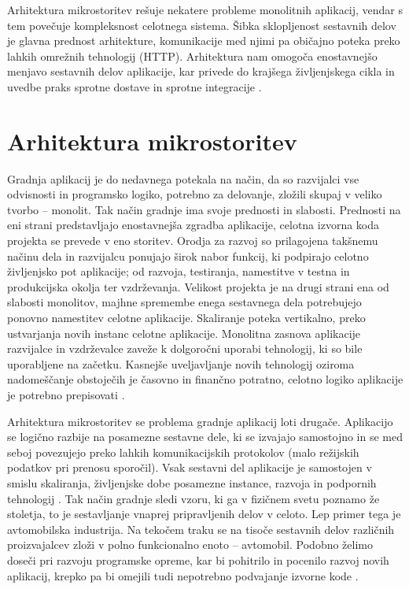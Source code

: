 \documentclass[a4paper, 12pt]{book}
\begin{document}
Arhitektura mikrostoritev rešuje nekatere probleme monolitnih aplikacij, vendar s tem povečuje kompleksnost celotnega sistema.
Šibka sklopljenost sestavnih delov je glavna prednost arhitekture, komunikacije med njimi pa običajno poteka preko lahkih omrežnih tehnologij (HTTP).
Arhitektura nam omogoča enostavnejšo menjavo sestavnih delov aplikacije, kar privede do krajšega življenjskega cikla in uvedbe praks sprotne dostave in sprotne integracije \cite{monolithMicroservice}.


\section{Arhitektura mikrostoritev}

Gradnja aplikacij je do nedavnega potekala na način, da so razvijalci vse odvisnosti in programsko logiko, potrebno za delovanje, zložili skupaj v veliko tvorbo -- monolit.
Tak način gradnje ima svoje prednosti in slabosti.
Prednosti na eni strani predstavljajo enostavnejša zgradba aplikacije, celotna izvorna koda projekta se prevede v eno storitev.
Orodja za razvoj so prilagojena takšnemu načinu dela in razvijalcu ponujajo širok nabor funkcij, ki podpirajo celotno življenjsko pot aplikacije; od razvoja, testiranja, namestitve v testna in produkcijska okolja ter vzdrževanja.
Velikost projekta je na drugi strani ena od slabosti monolitov, majhne spremembe enega sestavnega dela potrebujejo ponovno namestitev celotne aplikacije.
Skaliranje poteka vertikalno, preko ustvarjanja novih instanc celotne aplikacije.
Monolitna zasnova aplikacije razvijalce in vzdrževalce zaveže k dolgoročni uporabi tehnologij, ki so bile uporabljene na začetku.
Kasnejše uveljavljanje novih tehnologij oziroma nadomeščanje obstoječih je časovno in finančno potratno, celotno logiko aplikacije je potrebno prepisovati \cite{monolithMicroservice}.

Arhitektura mikrostoritev se problema gradnje aplikacij loti drugače.
Aplikacijo se logično razbije na posamezne sestavne dele, ki se izvajajo samostojno in se med seboj povezujejo preko lahkih komunikacijskih protokolov (malo režijskih podatkov pri prenosu sporočil).
Vsak sestavni del aplikacije je samostojen v smislu skaliranja, življenjske dobe posamezne instance, razvoja in podpornih tehnologij \cite{7030212}.
Tak način gradnje sledi vzoru, ki ga v fizičnem svetu poznamo že stoletja, to je sestavljanje vnaprej pripravljenih delov v celoto.
Lep primer tega je avtomobilska industrija.
Na tekočem traku se na tisoče sestavnih delov različnih proizvajalcev zloži v polno funkcionalno enoto -- avtomobil.
Podobno želimo doseči pri razvoju programske opreme, kar bi pohitrilo in pocenilo razvoj novih aplikacij, krepko pa bi omejili tudi nepotrebno podvajanje izvorne kode \cite{microservicePattern, microservicesMartin}.
\end{document}
